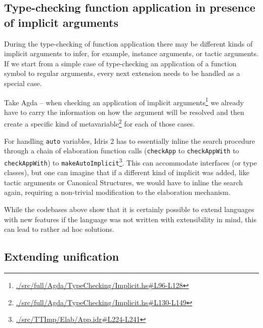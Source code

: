 \documentclass[
  sigconf,
  screen,
  review]{acmart}
\begin{document}
\hypertarget{sec:implicit-arguments}{%
\subsection{Type-checking function application in presence of implicit
arguments}\label{sec:implicit-arguments}}

During the type-checking of function application there may be different
kinds of implicit arguments to infer, for example, instance arguments,
or tactic arguments. If we start from a simple case of type-checking an
application of a function symbol to regular arguments, every next
extension needs to be handled as a special case.

Take Agda -- when checking an application of implicit
arguments\footnote{\href{https://github.com/agda/agda/blob/v2.6.4/src/full/Agda/TypeChecking/Implicit.hs\#L96-L128}{./src/full/Agda/TypeChecking/Implicit.hs\#L96-L128}}
we already have to carry the information on how the argument will be
resolved and then create a specific kind of metavariable\footnote{\href{https://github.com/agda/agda/blob/v2.6.4/src/full/Agda/TypeChecking/Implicit.hs\#L130-L149}{./src/full/Agda/TypeChecking/Implicit.hs\#L130-L149}}
\citep[chap.~3]{norellPracticalProgrammingLanguage2007} for each of
those cases.

For handling \texttt{auto} variables, Idris 2
\citep[chap.~13.1]{theidristeamIdrisTutorial2021} has to essentially
inline the search procedure through a chain of elaboration function
calls (\texttt{checkApp} to \texttt{checkAppWith} to
\texttt{checkAppWith\textquotesingle{}}) to
\texttt{makeAutoImplicit}\footnote{\href{https://github.com/idris-lang/Idris2/blob/870bc824371d504a03af937f326216302210a875/src/TTImp/Elab/App.idr\#L224-L241}{./src/TTImp/Elab/App.idr\#L224-L241}}.
This can accommodate interfaces (or type classes), but one can imagine
that if a different kind of implicit was added, like tactic arguments or
Canonical Structures, we would have to inline the search again,
requiring a non-trivial modification to the elaboration mechanism.

While the codebases above show that it is certainly possible to extend
languages with new features if the language was not written with
extensibility in mind, this can lead to rather ad hoc solutions.

\hypertarget{sec:extending-unification}{%
\subsection{Extending unification}\label{sec:extending-unification}}
\end{document}
